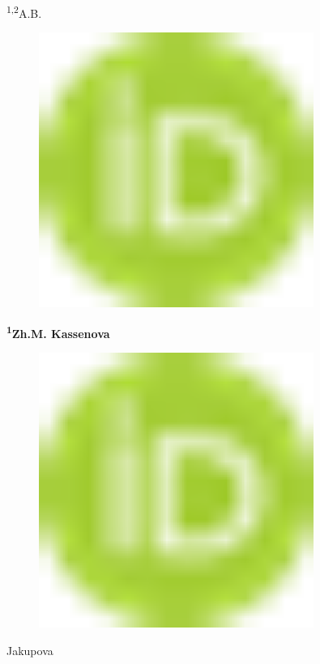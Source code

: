 {\textsuperscript{1,2}A.B.
\begin{figure}[H]
	\centering
	\includegraphics[width=0.8\textwidth]{media/chem/image1}
	\caption*{}
\end{figure}


{\bfseries \textsuperscript{1}Zh.M. Kassenova}
\begin{figure}[H]
	\centering
	\includegraphics[width=0.8\textwidth]{media/chem/image1}
	\caption*{}
\end{figure}

Jakupova}

